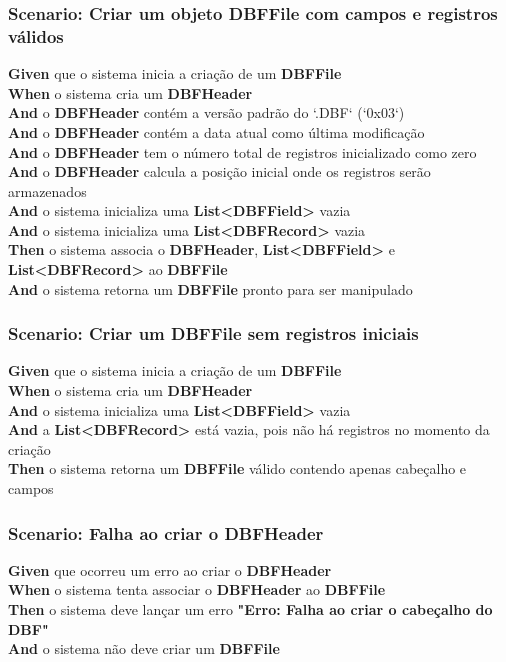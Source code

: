 \subsubsection{Scenario: Criar um objeto DBFFile com campos e registros válidos}
\textbf{Given} que o sistema inicia a criação de um \textbf{DBFFile} \\
\textbf{When} o sistema cria um \textbf{DBFHeader} \\
\textbf{And} o \textbf{DBFHeader} contém a versão padrão do `.DBF` (`0x03`) \\
\textbf{And} o \textbf{DBFHeader} contém a data atual como última modificação \\
\textbf{And} o \textbf{DBFHeader} tem o número total de registros inicializado como zero \\
\textbf{And} o \textbf{DBFHeader} calcula a posição inicial onde os registros serão armazenados \\
\textbf{And} o sistema inicializa uma \textbf{List<DBFField>} vazia \\
\textbf{And} o sistema inicializa uma \textbf{List<DBFRecord>} vazia \\
\textbf{Then} o sistema associa o \textbf{DBFHeader}, \textbf{List<DBFField>} e \textbf{List<DBFRecord>} ao \textbf{DBFFile} \\
\textbf{And} o sistema retorna um \textbf{DBFFile} pronto para ser manipulado \\

\subsubsection{Scenario: Criar um DBFFile sem registros iniciais}
\textbf{Given} que o sistema inicia a criação de um \textbf{DBFFile} \\
\textbf{When} o sistema cria um \textbf{DBFHeader} \\
\textbf{And} o sistema inicializa uma \textbf{List<DBFField>} vazia \\
\textbf{And} a \textbf{List<DBFRecord>} está vazia, pois não há registros no momento da criação \\
\textbf{Then} o sistema retorna um \textbf{DBFFile} válido contendo apenas cabeçalho e campos \\

\subsubsection{Scenario: Falha ao criar o DBFHeader}
\textbf{Given} que ocorreu um erro ao criar o \textbf{DBFHeader} \\
\textbf{When} o sistema tenta associar o \textbf{DBFHeader} ao \textbf{DBFFile} \\
\textbf{Then} o sistema deve lançar um erro \textbf{"Erro: Falha ao criar o cabeçalho do DBF"} \\
\textbf{And} o sistema não deve criar um \textbf{DBFFile} \\

